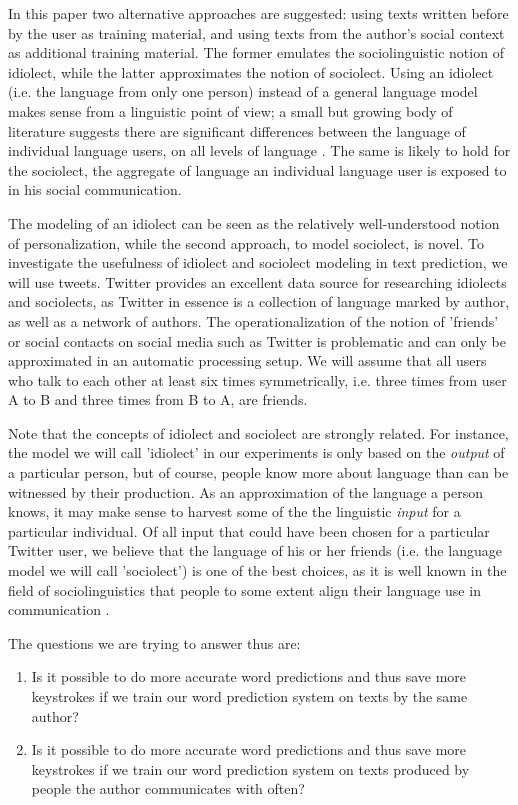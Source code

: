 \documentclass[11pt]{article}
\begin{document}
In this paper two alternative approaches are suggested: using texts written before by the user as training material, and using texts from the author's social context as additional training material. The former emulates the sociolinguistic notion of idiolect, while the latter approximates the notion of sociolect. Using an idiolect (i.e. the language from only one person) instead of a general language model makes sense from a linguistic point of view; a small but growing body of literature suggests there are significant differences between the language of individual language users, on all levels of language \cite[among others]{mollin09,barlow10}. The same is likely to hold for the sociolect, the aggregate of language an individual language user is exposed to in his social communication.

The modeling of an idiolect can be seen as the relatively well-understood notion of personalization, while the second approach, to model sociolect, is novel. To investigate the usefulness of idiolect and sociolect modeling in text prediction, we will use tweets. Twitter provides an excellent data source for researching idiolects and sociolects, as Twitter in essence is a collection of language marked by author, as well as a network of authors. The operationalization of the notion of 'friends' or social contacts on social media such as Twitter is problematic and can only be approximated in an automatic processing setup. We will assume that all users who talk to each other at least six times symmetrically, i.e. three times from user A to B and three times from B to A, are friends. 

Note that the concepts of idiolect and sociolect are strongly related. For instance, the model we will call 'idiolect' in our experiments is only based on the \emph{output} of a particular person, but of course, people know more about language than can be witnessed by their production. As an approximation of the language a person knows, it may make sense to harvest some of the the linguistic \emph{input} for a particular individual. Of all input that could have been chosen for a particular Twitter user, we believe that the language of his or her friends (i.e. the language model we will call 'sociolect') is one of the best choices, as it is well known in the field of sociolinguistics that people to some extent align their language use in communication \cite[among others]{meshtrie00}. 

The questions we are trying to answer thus are:

\begin{enumerate}
\item Is it possible to do more accurate word predictions and thus save more keystrokes if we train our word prediction system on texts by the same author?
\item Is it possible to do more accurate word predictions and thus save more keystrokes if we train our word prediction system on texts produced by people the author communicates with often?
\end{enumerate}
\end{document}
